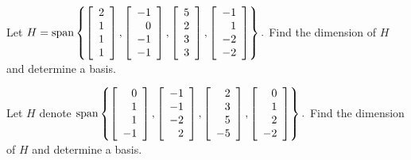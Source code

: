 \begin{enumialphparenastyle}

\begin{ex} Let $H = \mbox{span}\left\{ \left[ 
\begin{array}{r}
2 \\ 
1 \\ 
1 \\ 
1
\end{array}
\right] ,\left[ 
\begin{array}{r}
-1 \\ 
0 \\ 
-1 \\ 
-1
\end{array}
\right] ,\left[ 
\begin{array}{r}
5 \\ 
2 \\ 
3 \\ 
3
\end{array}
\right] ,\left[ 
\begin{array}{r}
-1 \\ 
1 \\ 
-2 \\ 
-2
\end{array}
\right] \right\} .$ Find the dimension of $H$ and determine a basis.
\end{ex}


\begin{ex} Let $H$ denote $\mbox{span}\left\{ \left[ 
\begin{array}{r}
0 \\ 
1 \\ 
1 \\ 
-1
\end{array}
\right] ,\left[ 
\begin{array}{r}
-1 \\ 
-1 \\ 
-2 \\ 
2
\end{array}
\right] ,\left[ 
\begin{array}{r}
2 \\ 
3 \\ 
5 \\ 
-5
\end{array}
\right] ,\left[ 
\begin{array}{r}
0 \\ 
1 \\ 
2 \\ 
-2
\end{array}
\right] \right\} .$ Find the dimension of $H$ and determine a basis.
\end{ex}



\end{enumialphparenastyle}
